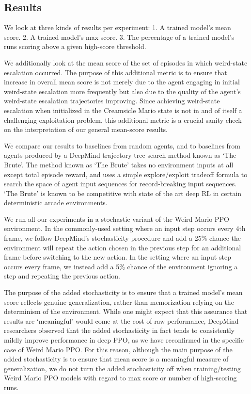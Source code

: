 \documentclass[]{article}
\begin{document}
\hypertarget{results}{%
\subsection{Results}\label{results}}

We look at three kinds of results per experiment: 1. A trained model's
mean score. 2. A trained model's max score. 3. The percentage of a
trained model's runs scoring above a given high-score threshold.

We additionally look at the mean score of the set of episodes in which
weird-state escalation occurred. The purpose of this additional metric
is to ensure that increase in overall mean score is not merely due to
the agent engaging in initial weird-state escalation more frequently but
also due to the quality of the agent's weird-state escalation
trajectories improving. Since achieving weird-state escalation when
initialized in the Creamsicle Mario state is not in and of itself a
challenging exploitation problem, this additional metric is a crucial
sanity check on the interpretation of our general mean-score results.

We compare our results to baselines from random agents, and to baselines
from agents produced by a DeepMind trajectory tree search method known
as `The Brute'. The method known as `The Brute' takes no environment
inputs at all except total episode reward, and uses a simple
explore/exploit tradeoff formula to search the space of agent input
sequences for record-breaking input sequences. `The Brute' is known to
be competitive with state of the art deep RL in certain deterministic
arcade environments.

We run all our experiments in a stochastic variant of the Weird Mario
PPO environment. In the commonly-used setting where an input step occurs
every 4th frame, we follow DeepMind's stochasticity procedure and add a
25\% chance the environment will repeat the action chosen in the
previous step for an additional frame before switching to the new
action. In the setting where an input step occurs every frame, we
instead add a 5\% chance of the environment ignoring a step and
repeating the previous action.

The purpose of the added stochasticity is to ensure that a trained
model's mean score reflects genuine generalization, rather than
memorization relying on the determinism of the environment. While one
might expect that this assurance that results are `meaningful' would
come at the cost of raw performance, DeepMind researchers observed that
the added stochasticity in fact tends to consistently mildly improve
performance in deep PPO, as we have reconfirmed in the specific case of
Weird Mario PPO. For this reason, although the main purpose of the added
stochasticity is to ensure that mean score is a meaningful measure of
generalization, we do not turn the added stochasticity off when
training/testing Weird Mario PPO models with regard to max score or
number of high-scoring runs.
\end{document}
